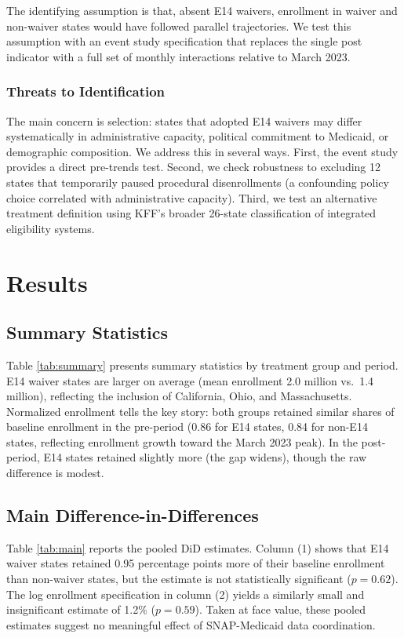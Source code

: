 \documentclass[12pt]{article}
\begin{document}
The identifying assumption is that, absent E14 waivers, enrollment in waiver and non-waiver states would have followed parallel trajectories. We test this assumption with an event study specification that replaces the single post indicator with a full set of monthly interactions relative to March 2023.

\subsubsection*{Threats to Identification} The main concern is selection: states that adopted E14 waivers may differ systematically in administrative capacity, political commitment to Medicaid, or demographic composition. We address this in several ways. First, the event study provides a direct pre-trends test. Second, we check robustness to excluding 12 states that temporarily paused procedural disenrollments (a confounding policy choice correlated with administrative capacity). Third, we test an alternative treatment definition using KFF's broader 26-state classification of integrated eligibility systems.

\section{Results}

\subsection{Summary Statistics}

Table \ref{tab:summary} presents summary statistics by treatment group and period. E14 waiver states are larger on average (mean enrollment 2.0 million vs.\ 1.4 million), reflecting the inclusion of California, Ohio, and Massachusetts. Normalized enrollment tells the key story: both groups retained similar shares of baseline enrollment in the pre-period (0.86 for E14 states, 0.84 for non-E14 states, reflecting enrollment growth toward the March 2023 peak). In the post-period, E14 states retained slightly more (the gap widens), though the raw difference is modest.

\subsection{Main Difference-in-Differences}

Table \ref{tab:main} reports the pooled DiD estimates. Column (1) shows that E14 waiver states retained 0.95 percentage points more of their baseline enrollment than non-waiver states, but the estimate is not statistically significant ($p = 0.62$). The log enrollment specification in column (2) yields a similarly small and insignificant estimate of 1.2\% ($p = 0.59$). Taken at face value, these pooled estimates suggest no meaningful effect of SNAP-Medicaid data coordination.
\end{document}
